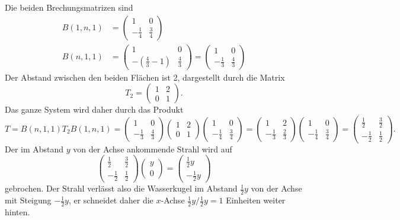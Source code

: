 \begin{loesung}
Die beiden Brechungsmatrizen sind
\begin{align}
B(1,n,1)
&=
\begin{pmatrix}
1&0\\
-\frac14&\frac34
\end{pmatrix}
\\
B(n,1,1)
&=
\begin{pmatrix}
1&0\\
-(\frac43-1)&\frac43
\end{pmatrix}
=
\begin{pmatrix}
1&0\\
-\frac13&\frac43
\end{pmatrix}
\end{align}
Der Abstand zwischen den beiden Flächen ist 2, dargestellt durch die Matrix
\[
T_2 =
\begin{pmatrix}
1&2\\
0&1
\end{pmatrix}.
\]
Das ganze System wird daher durch das Produkt
\[
T
=
B(n,1,1)T_2B(1,n,1)
=
\begin{pmatrix}
1&0\\
-\frac13&\frac43
\end{pmatrix}
\begin{pmatrix}
1&2\\
0&1
\end{pmatrix}
\begin{pmatrix}
1&0\\
-\frac14&\frac34
\end{pmatrix}
=
\begin{pmatrix}
1&2\\
-\frac13&\frac23
\end{pmatrix}
\begin{pmatrix}
1&0\\
-\frac14&\frac34
\end{pmatrix}
=
\begin{pmatrix}
\frac12 & \frac32 \\
-\frac12 & \frac12
\end{pmatrix}.
\]
Der im Abstand $y$ von der Achse ankommende Strahl wird auf
\[
\begin{pmatrix}
\frac12 & \frac32 \\
-\frac12 & \frac12
\end{pmatrix}
\begin{pmatrix}y\\0\end{pmatrix}
=
\begin{pmatrix}\frac12y\\-\frac12y\end{pmatrix}
\]
gebrochen.
Der Strahl verlässt also die Wasserkugel im Abstand $\frac12y$ von der
Achse mit Steigung $-\frac12y$, er schneidet daher die $x$-Achse
$\frac12y/\frac12y=1$ Einheiten weiter hinten.
\end{loesung}

